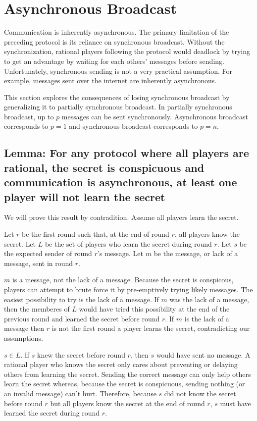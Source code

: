 \documentclass{dalcsthesis}
\begin{document}
\chapter{Asynchronous Broadcast}

Communication is inherently asynchronous. The primary limitation of the preceding protocol is its reliance on synchronous broadcast. Without the synchronization, rational players following the protocol would deadlock by trying to get an advantage by waiting for each others' messages before sending. Unfortunately, synchronous sending is not a very practical assumption. For example, messages sent over the internet are inherently asynchronous.

This section explores the consequences of losing synchronous broadcast by generalizing it to partially synchronous broadcast. In partially synchronous broadcast, up to $p$ messages can be sent synchronously. Asynchronous broadcast corresponds to $p=1$ and synchronous broadcast corresponds to $p=n$.

\section{Lemma: For any protocol where all players are rational, the secret is conspicuous and communication is asynchronous, at least one player will not learn the secret}

We will prove this result by contradition. Assume all players learn the secret.

Let $r$ be the first round such that, at the end of round $r$, all players know the secret. Let $L$ be the set of players who learn the secret during round $r$. Let $s$ be the expected sender of round $r$'s message. Let $m$ be the message, or lack of a message, sent in round $r$.

$m$ is a message, not the lack of a message. Because the secret is conspicous, players can attempt to brute force it by pre-emptively trying likely messages. The easiest possibility to try is the lack of a message. If $m$ was the lack of a message, then the memberes of $L$ would have tried this possibility at the end of the previous round and learned the secret before round $r$. If $m$ is the lack of a message then $r$ is not the first round a player learns the secret, contradicting our assumptions.

$s \in L$. If $s$ knew the secret before round $r$, then $s$ would have sent no message. A rational player who knows the secret only cares about preventing or delaying others from learning the secret. Sending the correct message can only help others learn the secret whereas, because the secret is conspicuous, sending nothing (or an invalid message) can't hurt. Therefore, because $s$ did not know the secret before round $r$ but all players know the secret at the end of round $r$, $s$ must have learned the secret during round $r$.
\end{document}
